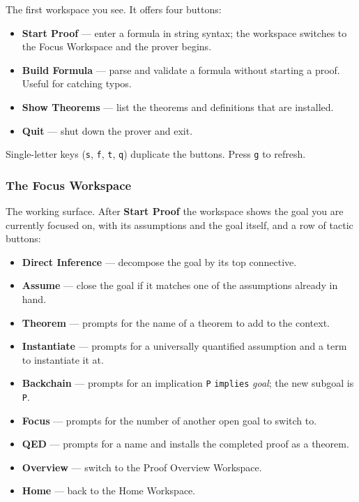 The first workspace you see.  It offers four buttons:

\begin{itemize}
\item \textbf{Start Proof} --- enter a formula in string syntax; the
  workspace switches to the Focus Workspace and the prover begins.
\item \textbf{Build Formula} --- parse and validate a formula
  without starting a proof.  Useful for catching typos.
\item \textbf{Show Theorems} --- list the theorems and definitions
  that are installed.
\item \textbf{Quit} --- shut down the prover and exit.
\end{itemize}

\noindent
Single-letter keys (\texttt{s}, \texttt{f}, \texttt{t}, \texttt{q})
duplicate the buttons.  Press \texttt{g} to refresh.

\subsubsection{The Focus Workspace}

The working surface.  After \textbf{Start Proof} the workspace shows
the goal you are currently focused on, with its assumptions and the
goal itself, and a row of tactic buttons:

\begin{itemize}
\item \textbf{Direct Inference} --- decompose the goal by its top
  connective.
\item \textbf{Assume} --- close the goal if it matches one of the
  assumptions already in hand.
\item \textbf{Theorem} --- prompts for the name of a theorem to add
  to the context.
\item \textbf{Instantiate} --- prompts for a universally quantified
  assumption and a term to instantiate it at.
\item \textbf{Backchain} --- prompts for an implication
  \texttt{P} \texttt{implies} \textit{goal}; the new subgoal is
  \texttt{P}.
\item \textbf{Focus} --- prompts for the number of another open
  goal to switch to.
\item \textbf{QED} --- prompts for a name and installs the
  completed proof as a theorem.
\item \textbf{Overview} --- switch to the Proof Overview Workspace.
\item \textbf{Home} --- back to the Home Workspace.
\end{itemize}

